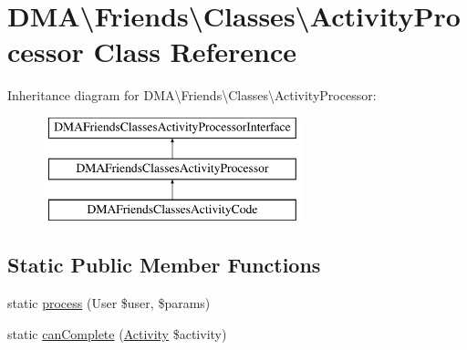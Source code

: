 \hypertarget{classDMA_1_1Friends_1_1Classes_1_1ActivityProcessor}{\section{D\+M\+A\textbackslash{}Friends\textbackslash{}Classes\textbackslash{}Activity\+Processor Class Reference}
\label{classDMA_1_1Friends_1_1Classes_1_1ActivityProcessor}
}
Inheritance diagram for D\+M\+A\textbackslash{}Friends\textbackslash{}Classes\textbackslash{}Activity\+Processor\+:\begin{figure}[H]
\begin{center}
\leavevmode
\includegraphics[height=3.000000cm]{db/d9c/classDMA_1_1Friends_1_1Classes_1_1ActivityProcessor}
\end{center}
\end{figure}
\subsection*{Static Public Member Functions}
\begin{DoxyCompactItemize}
\item 
static \hyperlink{classDMA_1_1Friends_1_1Classes_1_1ActivityProcessor_af892e6c3b63a5ef0002f97719839aa82}{process} (User \$user, \$params)
\item 
static \hyperlink{classDMA_1_1Friends_1_1Classes_1_1ActivityProcessor_adaddbe728558689c09abe18010c005e7}{can\+Complete} (\hyperlink{classDMA_1_1Friends_1_1Models_1_1Activity}{Activity} \$activity)
\end{DoxyCompactItemize}



